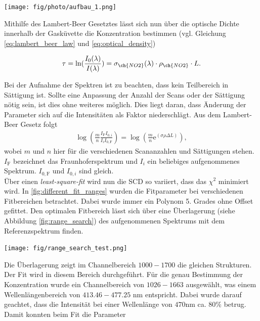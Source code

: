 \documentclass[12pt, a4paper, bibliography=totoc]{scrartcl}
\begin{document}
\begin{multicols}{2}
\begin{center}
    \texttt{[image: fig/photo/aufbau\_1.png]}
    \label{fig:aufbau_hal}
\end{center}


Mithilfe des Lambert-Beer Gesetztes lässt sich nun über die optische Dichte innerhalb der Gasküvette die Konzentration bestimmen (vgl. Gleichung \eqref{eq:lambert_beer_law} und \eqref{eq:optical_density})

\begin{align}
\tau = \ln(\frac{I_0(\lambda)}{I(\lambda)}) = \sigma_{\ch{NO2}}(\lambda) \cdot \rho_{\ch{NO2}} \cdot L.
\end{align}

Bei der Aufnahme der Spektren ist zu beachten, dass kein Teilbereich in Sättigung ist.
Sollte eine Anpassung der Anzahl der Scans oder der Sättigung nötig sein, ist dies ohne weiteres möglich. 
Dies liegt daran, dass Änderung der Parameter sich auf die Intensitäten als Faktor niederschlägt. 
Aus dem Lambert-Beer Gesetz folgt
\begin{align}
    \log \left( \frac{m}{n} \frac{I_\text{F} I_{0, i}}{I_i I_{0, \text{F}}} \right) = \log \left(\frac{m}{n} \text{e}^{(\sigma \rho \Delta L)}\right) ,
\end{align}
wobei $m$ und $n$ hier für die verschiedenen Scananzahlen und Sättigungen stehen. 
$I_\text{F}$ bezeichnet das Fraunhoferspektrum und $I_i$ ein beliebiges aufgenommenes Spektrum.
$I_{0, \text{F}}$ und $I_{0, i}$ sind gleich.
\\
Über einen \textit{least-square-fit} wird nun die SCD so variiert, dass das $\chi^2$ minimiert wird. 
In \ref{fig:different_fit_ranges} wurden die Fitparameter bei verschiedenen Fitbereichen betrachtet. 
Dabei wurde immer ein Polynom 5. Grades ohne Offset gefittet.
Den optimalen Fitbereich lässt sich über eine Überlagerung (siehe Abbildung \ref{fig:range_search}) des aufgenommenen Spektrums mit dem  Referenzspektrum finden.

\begin{center}
	\texttt{[image: fig/range\_search\_test.png]}
	\label{fig:range_search}
\end{center}

Die Überlagerung zeigt im Channelbereich $1000-1700$ die gleichen Strukturen. Der Fit wird in diesem Bereich durchgeführt.
Für die genau Bestimmung der  Konzentration wurde ein Channelbereich von $1026-1663$ ausgewählt, was einem Wellenlängenbereich von $413.46 - 477.25$ \si{nm} entspricht.
Dabei wurde darauf geachtet, dass die Intensität bei einer Wellenlänge von $470$\si{nm} ca. $80$\% betrug.
Damit konnten beim Fit die Parameter


\end{multicols}
\end{document}
